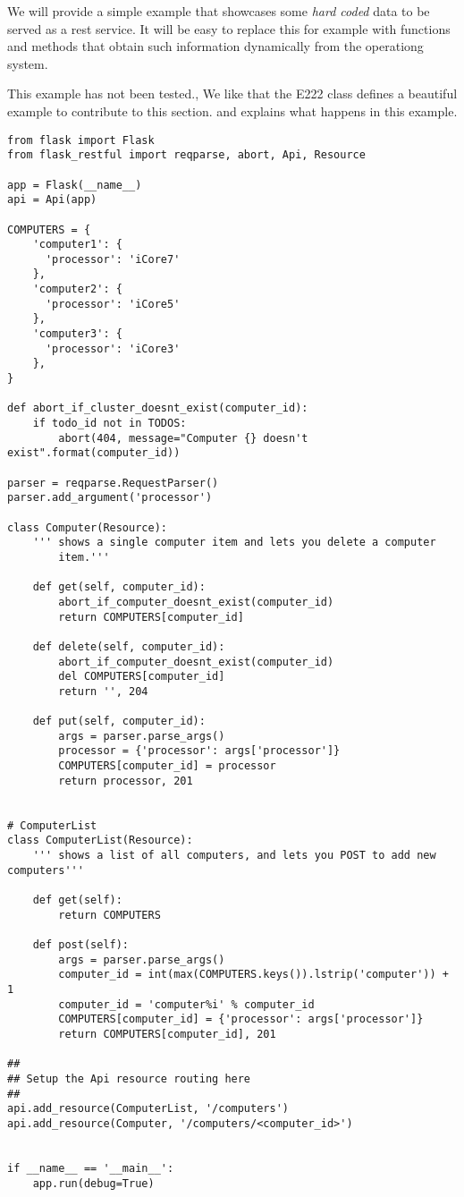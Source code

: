 We will provide a simple example that showcases some \textit{hard coded}
data to be served as a rest service. It will be easy to replace this
for example with functions and methods that obtain such information
dynamically from the operationg system. 

\begin{WARNING}
This example has not been tested., We like that the E222 class defines
a beautiful example to contribute to this section. and explains what
happens in this example.
\end{WARNING}


\begin{lstlisting}
from flask import Flask
from flask_restful import reqparse, abort, Api, Resource

app = Flask(__name__)
api = Api(app)

COMPUTERS = {
    'computer1': {
      'processor': 'iCore7'
    },
    'computer2': {
      'processor': 'iCore5'
    },
    'computer3': {
      'processor': 'iCore3'
    },
}

def abort_if_cluster_doesnt_exist(computer_id):
    if todo_id not in TODOS:
        abort(404, message="Computer {} doesn't exist".format(computer_id))

parser = reqparse.RequestParser()
parser.add_argument('processor')

class Computer(Resource):
    ''' shows a single computer item and lets you delete a computer
        item.'''

    def get(self, computer_id):
        abort_if_computer_doesnt_exist(computer_id)
        return COMPUTERS[computer_id]

    def delete(self, computer_id):
        abort_if_computer_doesnt_exist(computer_id)
        del COMPUTERS[computer_id]
        return '', 204

    def put(self, computer_id):
        args = parser.parse_args()
        processor = {'processor': args['processor']}
        COMPUTERS[computer_id] = processor
        return processor, 201


# ComputerList
class ComputerList(Resource):
    ''' shows a list of all computers, and lets you POST to add new computers'''

    def get(self):
        return COMPUTERS

    def post(self):
        args = parser.parse_args()
        computer_id = int(max(COMPUTERS.keys()).lstrip('computer')) + 1
        computer_id = 'computer%i' % computer_id
        COMPUTERS[computer_id] = {'processor': args['processor']}
        return COMPUTERS[computer_id], 201

##
## Setup the Api resource routing here
##
api.add_resource(ComputerList, '/computers')
api.add_resource(Computer, '/computers/<computer_id>')


if __name__ == '__main__':
    app.run(debug=True)
\end{lstlisting}


